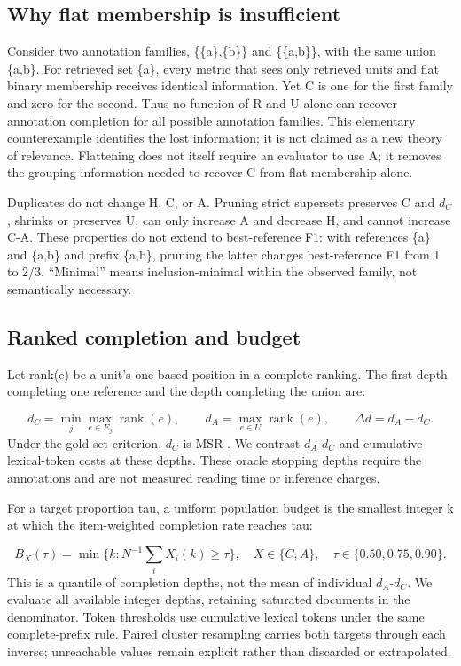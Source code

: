 \documentclass[twoside,a4paper,11pt]{article}
\begin{document}
\subsection{Why flat membership is insufficient}
Consider two annotation families, \{\{a\},\{b\}\} and \{\{a,b\}\}, with the same union \{a,b\}. For retrieved set \{a\}, every metric that sees only retrieved units and flat binary membership receives identical information. Yet C is one for the first family and zero for the second. Thus no function of R and U alone can recover annotation completion for all possible annotation families. This elementary counterexample identifies the lost information; it is not claimed as a new theory of relevance. Flattening does not itself require an evaluator to use A; it removes the grouping information needed to recover C from flat membership alone.

Duplicates do not change H, C, or A. Pruning strict supersets preserves C and $d_{C}$, shrinks or preserves U, can only increase A and decrease H, and cannot increase C-A. These properties do not extend to best-reference F1: with references \{a\} and \{a,b\} and prefix \{a,b\}, pruning the latter changes best-reference F1 from 1 to 2/3. ``Minimal'' means inclusion-minimal within the observed family, not semantically necessary.


\subsection{Ranked completion and budget}
Let rank(e) be a unit's one-based position in a complete ranking. The first depth completing one reference and the depth completing the union are:

\[
d_C=\min_j\max_{e\in E_j}\operatorname{rank}(e),\qquad d_A=\max_{e\in U}\operatorname{rank}(e),\qquad \Delta d=d_A-d_C.
\]
Under the gold-set criterion, $d_{C}$ is MSR \citep{alt2026}. We contrast $d_{A}$-$d_{C}$ and cumulative lexical-token costs at these depths. These oracle stopping depths require the annotations and are not measured reading time or inference charges.

For a target proportion tau, a uniform population budget is the smallest integer k at which the item-weighted completion rate reaches tau:

\[
B_X(\tau)=\min\{k:N^{-1}\sum_i X_i(k)\geq\tau\},\quad X\in\{C,A\},\quad\tau\in\{0.50,0.75,0.90\}.
\]
This is a quantile of completion depths, not the mean of individual $d_{A}$-$d_{C}$. We evaluate all available integer depths, retaining saturated documents in the denominator. Token thresholds use cumulative lexical tokens under the same complete-prefix rule. Paired cluster resampling carries both targets through each inverse; unreachable values remain explicit rather than discarded or extrapolated.
\end{document}
